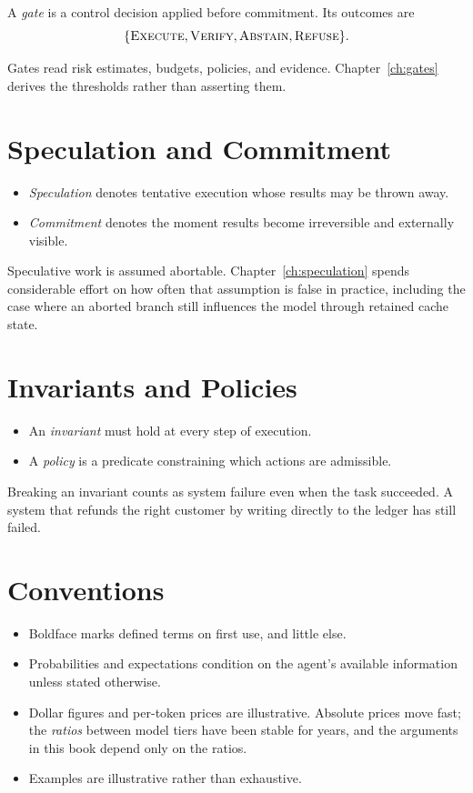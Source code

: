 \documentclass[11pt]{book}
\begin{document}
A \emph{gate} is a control decision applied before commitment. Its outcomes are
\[
\{\textsc{Execute}, \textsc{Verify}, \textsc{Abstain}, \textsc{Refuse}\}.
\]

Gates read risk estimates, budgets, policies, and evidence. Chapter~\ref{ch:gates}
derives the thresholds rather than asserting them.

\section*{Speculation and Commitment}

\begin{itemize}
\item \emph{Speculation} denotes tentative execution whose results may be thrown away.
\item \emph{Commitment} denotes the moment results become irreversible and externally visible.
\end{itemize}

Speculative work is assumed abortable. Chapter~\ref{ch:speculation} spends
considerable effort on how often that assumption is false in practice, including
the case where an aborted branch still influences the model through retained
cache state.

\section*{Invariants and Policies}

\begin{itemize}
\item An \emph{invariant} must hold at every step of execution.
\item A \emph{policy} is a predicate constraining which actions are admissible.
\end{itemize}

Breaking an invariant counts as system failure even when the task succeeded.
A system that refunds the right customer by writing directly to the ledger has
still failed.

\section*{Conventions}

\begin{itemize}
\item Boldface marks defined terms on first use, and little else.
\item Probabilities and expectations condition on the agent's available
information unless stated otherwise.
\item Dollar figures and per-token prices are illustrative. Absolute prices move
fast; the \emph{ratios} between model tiers have been stable for years, and the
arguments in this book depend only on the ratios.
\item Examples are illustrative rather than exhaustive.
\end{itemize}
\end{document}
